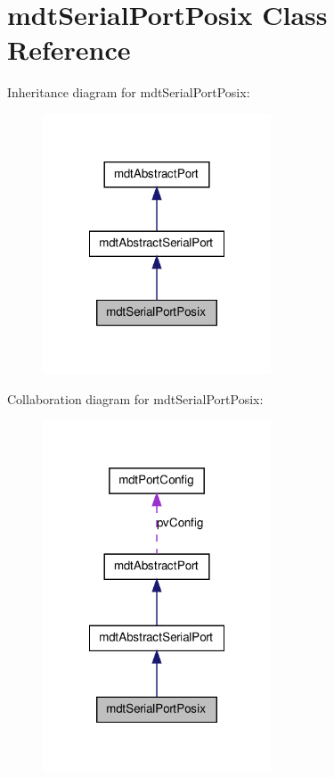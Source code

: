 \hypertarget{classmdt_serial_port_posix}{
\section{mdtSerialPortPosix Class Reference}
\label{classmdt_serial_port_posix}
}


Inheritance diagram for mdtSerialPortPosix:
\nopagebreak
\begin{figure}[H]
\begin{center}
\leavevmode
\includegraphics[width=192pt]{classmdt_serial_port_posix__inherit__graph}
\end{center}
\end{figure}


Collaboration diagram for mdtSerialPortPosix:
\nopagebreak
\begin{figure}[H]
\begin{center}
\leavevmode
\includegraphics[width=192pt]{classmdt_serial_port_posix__coll__graph}
\end{center}
\end{figure}
